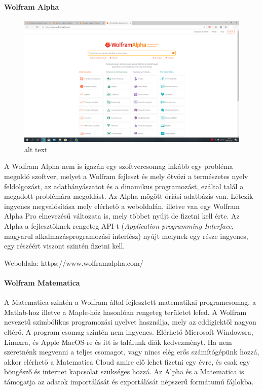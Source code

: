     \paragraph{Wolfram Alpha}\label{wolfram-alpha}

\begin{figure}
\centering
\includegraphics{img/alpha_screen.png}
\caption{alt text}
\end{figure}

A Wolfram Alpha nem is igazán egy szoftvercsomag inkább egy probléma
megoldó szoftver, melyet a Wolfram fejleszt és mely ötvözi a természetes
nyelv feldolgozást, az adatbányászatot és a dinamikus programozást,
ezáltal talál a megadott problémára megoldást. Az Alpha mögött óriási
adatbázis van. Létezik ingyenes megvalósítása mely elérhető a
weboldalán, illetve van egy Wolfram Alpha Pro elnevezésű változata is,
mely többet nyújt de fizetni kell érte. Az Alpha a fejlesztőknek
rengeteg API-t (\emph{Application programming Interface}, magyarul
alkalmazásprogramozási interfész) nyújt melynek egy része ingyenes, egy
részéért viszont szintén fizetni kell.

Weboldala: https://www.wolframalpha.com/

\paragraph{Wolfram Matematica}\label{wolfram-matematica}

A Matematica szintén a Wolfram által fejlesztett matematikai
programcsomag, a Matlab-hoz illetve a Maple-höz hasonlóan rengeteg
területet lefed. A Wolfram nevezetű szimbólikus programozási nyelvet
használja, mely az eddigiektől nagyon eltérő. A program csomag szintén
nem ingyenes. Elérhető Microsoft Windowsra, Linuxra, és Apple MacOS-re
és itt is találunk diák kedvezményt. Ha nem szeretnénk megvenni a teljes
csomagot, vagy nincs elég erős számítógépünk hozzá, akkor elérhető a
Matematica Cloud amire elő lehet fizetni egy évre, és csak egy böngésző
és internet kapcsolat szükséges hozzá. Az Alpha és a Matematica is
támogatja az adatok importálását és exportálását népszerű formátumú
fájlokba.

